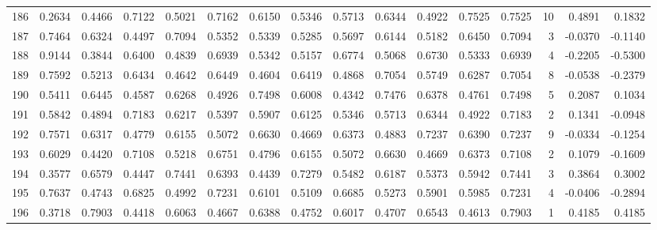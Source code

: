 \begin{tabular}{lrrrrrrrrrrrrrrr}
186 &      0.2634 &  0.4466 &  0.7122 &  0.5021 &  0.7162 &  0.6150 &  0.5346 &  0.5713 &  0.6344 &  0.4922 &   0.7525 &     0.7525 &     10 &                    0.4891 &                     0.1832 \\
187 &      0.7464 &  0.6324 &  0.4497 &  0.7094 &  0.5352 &  0.5339 &  0.5285 &  0.5697 &  0.6144 &  0.5182 &   0.6450 &     0.7094 &      3 &                   -0.0370 &                    -0.1140 \\
188 &      0.9144 &  0.3844 &  0.6400 &  0.4839 &  0.6939 &  0.5342 &  0.5157 &  0.6774 &  0.5068 &  0.6730 &   0.5333 &     0.6939 &      4 &                   -0.2205 &                    -0.5300 \\
189 &      0.7592 &  0.5213 &  0.6434 &  0.4642 &  0.6449 &  0.4604 &  0.6419 &  0.4868 &  0.7054 &  0.5749 &   0.6287 &     0.7054 &      8 &                   -0.0538 &                    -0.2379 \\
190 &      0.5411 &  0.6445 &  0.4587 &  0.6268 &  0.4926 &  0.7498 &  0.6008 &  0.4342 &  0.7476 &  0.6378 &   0.4761 &     0.7498 &      5 &                    0.2087 &                     0.1034 \\
191 &      0.5842 &  0.4894 &  0.7183 &  0.6217 &  0.5397 &  0.5907 &  0.6125 &  0.5346 &  0.5713 &  0.6344 &   0.4922 &     0.7183 &      2 &                    0.1341 &                    -0.0948 \\
192 &      0.7571 &  0.6317 &  0.4779 &  0.6155 &  0.5072 &  0.6630 &  0.4669 &  0.6373 &  0.4883 &  0.7237 &   0.6390 &     0.7237 &      9 &                   -0.0334 &                    -0.1254 \\
193 &      0.6029 &  0.4420 &  0.7108 &  0.5218 &  0.6751 &  0.4796 &  0.6155 &  0.5072 &  0.6630 &  0.4669 &   0.6373 &     0.7108 &      2 &                    0.1079 &                    -0.1609 \\
194 &      0.3577 &  0.6579 &  0.4447 &  0.7441 &  0.6393 &  0.4439 &  0.7279 &  0.5482 &  0.6187 &  0.5373 &   0.5942 &     0.7441 &      3 &                    0.3864 &                     0.3002 \\
195 &      0.7637 &  0.4743 &  0.6825 &  0.4992 &  0.7231 &  0.6101 &  0.5109 &  0.6685 &  0.5273 &  0.5901 &   0.5985 &     0.7231 &      4 &                   -0.0406 &                    -0.2894 \\
196 &      0.3718 &  0.7903 &  0.4418 &  0.6063 &  0.4667 &  0.6388 &  0.4752 &  0.6017 &  0.4707 &  0.6543 &   0.4613 &     0.7903 &      1 &                    0.4185 &                     0.4185 \\

\end{tabular}
